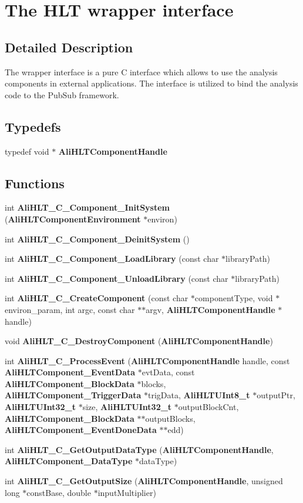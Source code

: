 \section{The HLT wrapper interface}
\label{group__alihlt__wrapper__interface}


\subsection{Detailed Description}
The wrapper interface is a pure C interface which allows to use the analysis components in external applications. The interface is utilized to bind the analysis code to the Pub\-Sub framework.



\subsection*{Typedefs}
\begin{CompactItemize}
\item 
typedef void $\ast$ {\bf Ali\-HLTComponent\-Handle}
\end{CompactItemize}
\subsection*{Functions}
\begin{CompactItemize}
\item 
int {\bf Ali\-HLT\_\-C\_\-Component\_\-Init\-System} ({\bf Ali\-HLTComponent\-Environment} $\ast$environ)
\item 
int {\bf Ali\-HLT\_\-C\_\-Component\_\-Deinit\-System} ()
\item 
int {\bf Ali\-HLT\_\-C\_\-Component\_\-Load\-Library} (const char $\ast$library\-Path)
\item 
int {\bf Ali\-HLT\_\-C\_\-Component\_\-Unload\-Library} (const char $\ast$library\-Path)
\item 
int {\bf Ali\-HLT\_\-C\_\-Create\-Component} (const char $\ast$component\-Type, void $\ast$environ\_\-param, int argc, const char $\ast$$\ast$argv, {\bf Ali\-HLTComponent\-Handle} $\ast$handle)
\item 
void {\bf Ali\-HLT\_\-C\_\-Destroy\-Component} ({\bf Ali\-HLTComponent\-Handle})
\item 
int {\bf Ali\-HLT\_\-C\_\-Process\-Event} ({\bf Ali\-HLTComponent\-Handle} handle, const {\bf Ali\-HLTComponent\_\-Event\-Data} $\ast$evt\-Data, const {\bf Ali\-HLTComponent\_\-Block\-Data} $\ast$blocks, {\bf Ali\-HLTComponent\_\-Trigger\-Data} $\ast$trig\-Data, {\bf Ali\-HLTUInt8\_\-t} $\ast$output\-Ptr, {\bf Ali\-HLTUInt32\_\-t} $\ast$size, {\bf Ali\-HLTUInt32\_\-t} $\ast$output\-Block\-Cnt, {\bf Ali\-HLTComponent\_\-Block\-Data} $\ast$$\ast$output\-Blocks, {\bf Ali\-HLTComponent\_\-Event\-Done\-Data} $\ast$$\ast$edd)
\item 
int {\bf Ali\-HLT\_\-C\_\-Get\-Output\-Data\-Type} ({\bf Ali\-HLTComponent\-Handle}, {\bf Ali\-HLTComponent\_\-Data\-Type} $\ast$data\-Type)
\item 
int {\bf Ali\-HLT\_\-C\_\-Get\-Output\-Size} ({\bf Ali\-HLTComponent\-Handle}, unsigned long $\ast$const\-Base, double $\ast$input\-Multiplier)
\end{CompactItemize}
